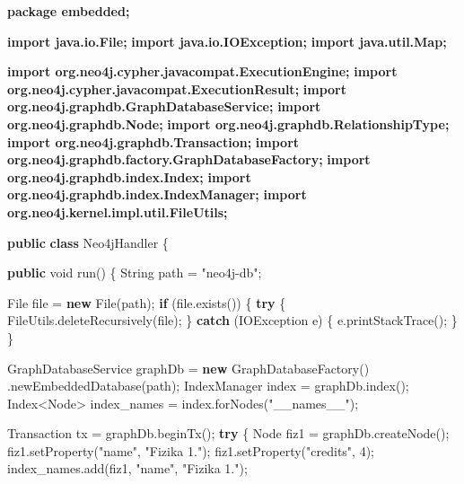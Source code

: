 \documentclass[]{report}
\newenvironment{Shaded}{}{}
\newcommand{\KeywordTok}[1]{\textcolor[rgb]{0.00,0.44,0.13}{\textbf{{#1}}}}
\newcommand{\DataTypeTok}[1]{\textcolor[rgb]{0.56,0.13,0.00}{{#1}}}
\newcommand{\DecValTok}[1]{\textcolor[rgb]{0.25,0.63,0.44}{{#1}}}
\newcommand{\StringTok}[1]{\textcolor[rgb]{0.25,0.44,0.63}{{#1}}}
\newcommand{\FunctionTok}[1]{\textcolor[rgb]{0.02,0.16,0.49}{{#1}}}
\newcommand{\NormalTok}[1]{{#1}}
\begin{document}
\begin{Shaded}
\begin{Highlighting}[]
\KeywordTok{package embedded;}

\KeywordTok{import java.io.File;}
\KeywordTok{import java.io.IOException;}
\KeywordTok{import java.util.Map;}

\KeywordTok{import org.neo4j.cypher.javacompat.ExecutionEngine;}
\KeywordTok{import org.neo4j.cypher.javacompat.ExecutionResult;}
\KeywordTok{import org.neo4j.graphdb.GraphDatabaseService;}
\KeywordTok{import org.neo4j.graphdb.Node;}
\KeywordTok{import org.neo4j.graphdb.RelationshipType;}
\KeywordTok{import org.neo4j.graphdb.Transaction;}
\KeywordTok{import org.neo4j.graphdb.factory.GraphDatabaseFactory;}
\KeywordTok{import org.neo4j.graphdb.index.Index;}
\KeywordTok{import org.neo4j.graphdb.index.IndexManager;}
\KeywordTok{import org.neo4j.kernel.impl.util.FileUtils;}

\KeywordTok{public} \KeywordTok{class} \NormalTok{Neo4jHandler \{}

    \KeywordTok{public} \DataTypeTok{void} \FunctionTok{run}\NormalTok{() \{}
        \NormalTok{String path = }\StringTok{"neo4j-db"}\NormalTok{;}

        \NormalTok{File file = }\KeywordTok{new} \NormalTok{File(path);}
        \KeywordTok{if} \NormalTok{(file.}\FunctionTok{exists}\NormalTok{()) \{}
            \KeywordTok{try} \NormalTok{\{}
                \NormalTok{FileUtils.}\FunctionTok{deleteRecursively}\NormalTok{(file);}
            \NormalTok{\} }\KeywordTok{catch} \NormalTok{(IOException e) \{}
                \NormalTok{e.}\FunctionTok{printStackTrace}\NormalTok{();}
            \NormalTok{\}}
        \NormalTok{\}}

        \NormalTok{GraphDatabaseService graphDb = }\KeywordTok{new} \FunctionTok{GraphDatabaseFactory}\NormalTok{()}
                \NormalTok{.}\FunctionTok{newEmbeddedDatabase}\NormalTok{(path);}
        \NormalTok{IndexManager index = graphDb.}\FunctionTok{index}\NormalTok{();}
        \NormalTok{Index<Node> index_names = index.}\FunctionTok{forNodes}\NormalTok{(}\StringTok{"__names__"}\NormalTok{);}

        \NormalTok{Transaction tx = graphDb.}\FunctionTok{beginTx}\NormalTok{();}
        \KeywordTok{try} \NormalTok{\{}
            \NormalTok{Node fiz1 = graphDb.}\FunctionTok{createNode}\NormalTok{();}
            \NormalTok{fiz1.}\FunctionTok{setProperty}\NormalTok{(}\StringTok{"name"}\NormalTok{, }\StringTok{"Fizika 1."}\NormalTok{);}
            \NormalTok{fiz1.}\FunctionTok{setProperty}\NormalTok{(}\StringTok{"credits"}\NormalTok{, }\DecValTok{4}\NormalTok{);}
            \NormalTok{index_names.}\FunctionTok{add}\NormalTok{(fiz1, }\StringTok{"name"}\NormalTok{, }\StringTok{"Fizika 1."}\NormalTok{);}


\end{Highlighting}
\end{Shaded}
\end{document}
